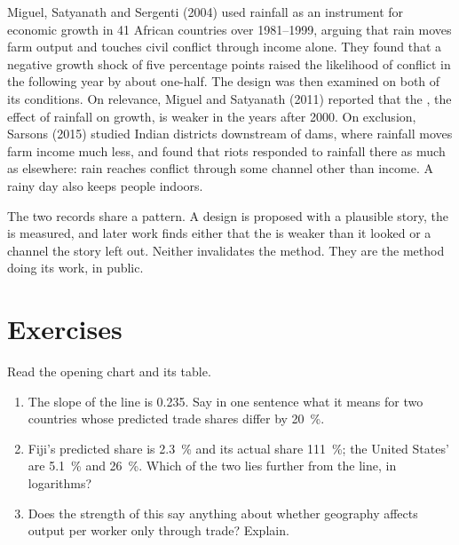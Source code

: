 \begin{record}
Miguel, Satyanath and Sergenti (2004) used rainfall as an instrument for
economic growth in 41 African countries over 1981--1999, arguing that rain
moves farm output and touches civil conflict through income alone. They found
that a negative growth shock of five percentage points raised the likelihood
of conflict in the following year by about one-half. %
The design was then examined on both of its conditions. On relevance, Miguel
and Satyanath (2011) reported that the , the effect of rainfall on
growth, is weaker in the years after 2000. %
On exclusion, Sarsons (2015) studied
Indian districts downstream of dams, where rainfall moves farm income much
less, and found that riots responded to rainfall there as much as elsewhere:
rain reaches conflict through some channel other than income. %
A rainy day
also keeps people indoors.
\end{record}

The two records share a pattern. A design is proposed with a plausible story,
the  is measured, and later work finds either that the 
is weaker than it looked or a channel the story left out. Neither invalidates
the method. They are the method doing its work, in public.

\section{Exercises}\label{sec:b3:instrumental-variables:exercises}

\begin{exercise}[$\star$]\label{exo:b3:instrumental-variables:1}
Read the opening chart and its table.
\begin{enumerate}
\item The slope of the line is 0.235. Say in one sentence what it means for
two countries whose predicted trade shares differ by 20~\%.
\item Fiji's predicted share is 2.3~\% and its actual share 111~\%; the United
States' are 5.1~\% and 26~\%. Which of the two lies further from the line, in
logarithms?
\item Does the strength of this  say anything about whether
geography affects output per worker only through trade? Explain.
\end{enumerate}
\end{exercise}

